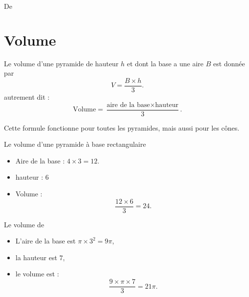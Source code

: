 
De \cite{NRHooXFvgpp4}

\section{Volume}

\begin{propriete}
    Le volume d'une pyramide de hauteur \( h\) et dont la base a une aire \( B\) est donnée par
    \begin{equation}
        V=\frac{ B\times h }{ 3 }.
    \end{equation}
    autrement dit :
    \begin{equation}
        \text{Volume}=\frac{ \text{aire de la base}\times \text{hauteur} }{ 3 }.
    \end{equation}
\end{propriete}
Cette formule fonctionne pour toutes les pyramides, mais aussi pour les cônes.

\begin{example}
    Le volume d'une pyramide à base rectangulaire

    \begin{center}         
                                                                  
\end{center}

\begin{itemize}
    \item 
        Aire de la base : \( 4\times 3=12\).
    \item
        hauteur : \( 6\)
    \item
        Volume : 
        \begin{equation}
            \dfrac{ 12\times 6 }{ 3 }=24.
        \end{equation}
\end{itemize}

\end{example}

\begin{example}
    Le volume de
\begin{center}
   
\end{center}

\begin{itemize}
    \item L'aire de la base est \( \pi\times 3^2=9\pi\),
    \item la hauteur est \( 7\),
    \item le volume est :
        \begin{equation}
            \frac{ 9\times \pi\times 7 }{ 3 }=21\pi.
        \end{equation}
\end{itemize}
\end{example}

